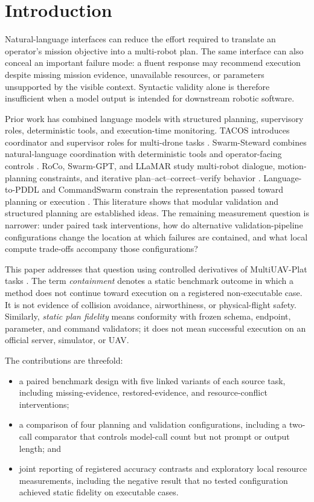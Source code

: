 \documentclass[conference]{IEEEtran}
\begin{document}
\section{Introduction}

Natural-language interfaces can reduce the effort required to translate an
operator's mission objective into a multi-robot plan. The same interface can
also conceal an important failure mode: a fluent response may recommend
execution despite missing mission evidence, unavailable resources, or
parameters unsupported by the visible context. Syntactic validity alone is
therefore insufficient when a model output is intended for downstream robotic
software.

Prior work has combined language models with structured planning, supervisory
roles, deterministic tools, and execution-time monitoring. TACOS introduces
coordinator and supervisor roles for multi-drone tasks \cite{tacos}.
Swarm-Steward combines natural-language coordination with deterministic tools
and operator-facing controls \cite{swarm_steward}. RoCo, Swarm-GPT, and LLaMAR
study multi-robot dialogue, motion-planning constraints, and iterative
plan--act--correct--verify behavior \cite{roco,swarm_gpt,llamar}.
Language-to-PDDL and CommandSwarm constrain the representation passed toward
planning or execution \cite{language_pddl,commandswarm}. This literature shows
that modular validation and structured planning are established ideas. The
remaining measurement question is narrower: under paired task interventions,
how do alternative validation-pipeline configurations change the location at
which failures are contained, and what local compute trade-offs accompany
those configurations?

This paper addresses that question using controlled derivatives of
MultiUAV-Plat tasks \cite{multiuav_plat}. The term \emph{containment} denotes a
static benchmark outcome in which a method does not continue toward execution
on a registered non-executable case. It is not evidence of collision avoidance,
airworthiness, or physical-flight safety. Similarly, \emph{static plan
fidelity} means conformity with frozen schema, endpoint, parameter, and command
validators; it does not mean successful execution on an official server,
simulator, or UAV.

The contributions are threefold:
\begin{itemize}
  \item a paired benchmark design with five linked variants of each source task,
        including missing-evidence, restored-evidence, and resource-conflict
        interventions;
  \item a comparison of four planning and validation configurations, including
        a two-call comparator that controls model-call count but not prompt or
        output length; and
  \item joint reporting of registered accuracy contrasts and exploratory local
        resource measurements, including the negative result that no tested
        configuration achieved static fidelity on executable cases.
\end{itemize}
\end{document}
